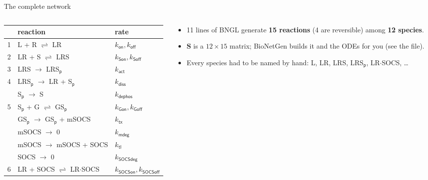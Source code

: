 \documentclass[aspectratio=169,10pt,t]{beamer}
\begin{document}
\begin{frame}{The complete network}
  \begin{columns}[T]
    \begin{column}{0.5\textwidth}
      \small
      \begin{tabular}{@{}rll@{}}
        \toprule
        & reaction & rate \\
        \midrule
        1 & L + R $\rightleftharpoons$ LR & $k_\mathsf{on}, k_\mathsf{off}$\\
        2 & LR + S $\rightleftharpoons$ LRS & $k_\mathsf{Son}, k_\mathsf{Soff}$\\
        3 & LRS $\to$ LRS$_\mathsf{p}$ & $k_\mathsf{act}$\\
        4 & LRS$_\mathsf{p}$ $\to$ LR + S$_\mathsf{p}$ & $k_\mathsf{diss}$\\
          & S$_\mathsf{p}$ $\to$ S & $k_\mathsf{dephos}$\\
        5 & S$_\mathsf{p}$ + G $\rightleftharpoons$ GS$_\mathsf{p}$ & $k_\mathsf{Gon}, k_\mathsf{Goff}$\\
          & GS$_\mathsf{p}$ $\to$ GS$_\mathsf{p}$ + mSOCS & $k_\mathsf{tx}$\\
          & mSOCS $\to$ 0 & $k_\mathsf{mdeg}$\\
          & mSOCS $\to$ mSOCS + SOCS & $k_\mathsf{tl}$\\
          & SOCS $\to$ 0 & $k_\mathsf{SOCSdeg}$\\
        6 & LR + SOCS $\rightleftharpoons$ LR$\cdot$SOCS & $k_\mathsf{SOCSon}, k_\mathsf{SOCSoff}$\\
        \bottomrule
      \end{tabular}
    \end{column}
    \begin{column}{0.46\textwidth}
      \begin{itemize}[<+(1)->]
        \setlength\itemsep{1.5mm}
        \item 11 lines of BNGL generate \textbf{15 reactions} (4 are reversible)
              among \textbf{12 species}.
        \item $\mathbf{S}$ is a $12\times15$ matrix; BioNetGen builds it and the ODEs
              for you (see the  file).
        \item Every species had to be named by hand: L, LR, LRS, LRS$_\mathsf{p}$,
              LR$\cdot$SOCS, \ldots
      \end{itemize}
    \end{column}
  \end{columns}
\end{frame}
\end{document}

